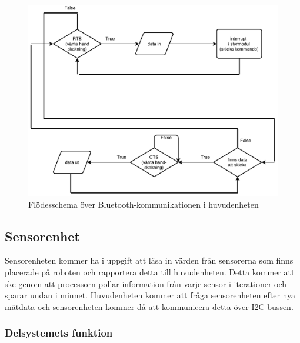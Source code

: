 \documentclass{article}
\begin{document}
\begin{figure}[H]
\centering
\includegraphics[scale=0.45]{Bluetooth_kommunikation_i_robot}
\caption{Flödesschema över Bluetooth-kommunikationen i huvudenheten}
\label{fig:Bluetooth_kommunikation_i_robot}
\end{figure}

\clearpage

\subsection{Sensorenhet}
Sensorenheten kommer ha i uppgift att läsa in värden från sensorerna som finns placerade på roboten och rapportera detta till huvudenheten. Detta kommer att ske genom att processorn pollar information från varje sensor i iterationer och sparar undan i minnet. Huvudenheten kommer att fråga sensorenheten efter nya mätdata och sensorenheten kommer då att kommunicera detta över I2C bussen.

\subsubsection{Delsystemets funktion}
\end{document}

